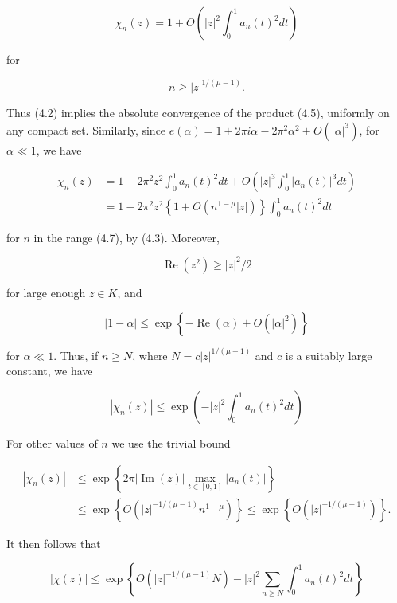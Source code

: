 \documentclass[10pt]{article}
\begin{document}
$$
\chi_{n}(z)=1+O\left(|z|^{2} \int_{0}^{1} a_{n}(t)^{2} d t\right)
$$

for


\begin{equation*}
n \geq|z|^{1 /(\mu-1)}. \tag{4.7}
\end{equation*}


Thus (4.2) implies the absolute convergence of the product (4.5), uniformly on any compact set. Similarly, since $e(\alpha)=1+2 \pi i \alpha-2 \pi^{2} \alpha^{2}+O\left(|\alpha|^{3}\right)$, for $\alpha \ll 1$, we have

$$
\begin{aligned}
\chi_{n}(z) & =1-2 \pi^{2} z^{2} \int_{0}^{1} a_{n}(t)^{2} d t+O\left(|z|^{3} \int_{0}^{1}\left|a_{n}(t)\right|^{3} d t\right) \\
& =1-2 \pi^{2} z^{2}\left\{1+O\left(n^{1-\mu}|z|\right)\right\} \int_{0}^{1} a_{n}(t)^{2} d t
\end{aligned}
$$

for $n$ in the range (4.7), by (4.3). Moreover,

$$
\operatorname{Re}\left(z^{2}\right) \geq|z|^{2} / 2
$$

for large enough $z \in K$, and

$$
|1-\alpha| \leq \exp \left\{-\operatorname{Re}(\alpha)+O\left(|\alpha|^{2}\right)\right\}
$$

for $\alpha \ll 1$. Thus, if $n \geq N$, where $N=c|z|^{1 /(\mu-1)}$ and $c$ is a suitably large constant, we have

$$
\left|\chi_{n}(z)\right| \leq \exp \left(-|z|^{2} \int_{0}^{1} a_{n}(t)^{2} d t\right)
$$

For other values of $n$ we use the trivial bound

$$
\begin{aligned}
\left|\chi_{n}(z)\right| & \leq \exp \left\{2 \pi|\operatorname{Im}(z)| \max _{t \in[0,1]}\left|a_{n}(t)\right|\right\} \\
& \leq \exp \left\{O\left(|z|^{-1 /(\mu-1)} n^{1-\mu}\right)\right\} \leq \exp \left\{O\left(|z|^{-1 /(\mu-1)}\right)\right\} .
\end{aligned}
$$

It then follows that


\begin{equation*}
|\chi(z)| \leq \exp \left\{O\left(|z|^{-1 /(\mu-1)} N\right)-|z|^{2} \sum_{n \geq N} \int_{0}^{1} a_{n}(t)^{2} d t\right\} \tag{4.8}
\end{equation*}
\end{document}
